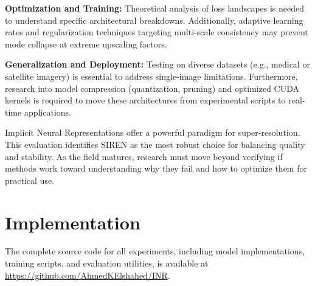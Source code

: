 \documentclass[a4paper,oneside,10pt,ngerman,english]{scrartcl}
\begin{document}
\textbf{Optimization and Training:} Theoretical analysis of loss landscapes is needed to understand specific architectural breakdowns. Additionally, adaptive learning rates and regularization techniques targeting multi-scale consistency may prevent mode collapse at extreme upscaling factors.
    
\textbf{Generalization and Deployment:} Testing on diverse datasets (e.g., medical or satellite imagery) is essential to address single-image limitations. Furthermore, research into model compression (quantization, pruning) and optimized CUDA kernels is required to move these architectures from experimental scripts to real-time applications.

Implicit Neural Representations offer a powerful paradigm for super-resolution. This evaluation identifies SIREN as the most robust choice for balancing quality and stability. As the field matures, research must move beyond verifying if methods work toward understanding why they fail and how to optimize them for practical use.


\cleardoubleoddpage
\printbibliography

\appendix

\section{Implementation}
\label{app:implementation}

The complete source code for all experiments, including model implementations, training scripts, and evaluation utilities, is available at \url{https://github.com/AhmedKElshahed/INR}.

\cleardoubleoddpage
\end{document}
